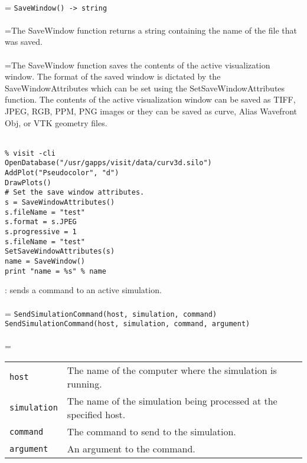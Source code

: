 \documentclass[10pt,a4paper]{report}
\begin{document}
 \\ 
\hangindent=\parindent 
\verb!SaveWindow() -> string!\\ [-3mm]

 \\ 
\hangindent=\parindent The SaveWindow function returns a string containing the name of the file that was saved. \\[-3mm] 

 \\ 
\hangindent=\parindent The SaveWindow function saves the contents of the active visualization window. The format of the saved window is dictated by the SaveWindowAttributes which can be set using the SetSaveWindowAttributes function. The contents of the active visualization window can be saved as TIFF, JPEG, RGB, PPM, PNG images or they can be saved as curve, Alias Wavefront Obj, or VTK geometry files. \\[-3mm] 

\\[-6mm]
\begin{verbatim}% visit -cli
OpenDatabase("/usr/gapps/visit/data/curv3d.silo")
AddPlot("Pseudocolor", "d")
DrawPlots()
# Set the save window attributes.
s = SaveWindowAttributes()
s.fileName = "test"
s.format = s.JPEG
s.progressive = 1
s.fileName = "test"
SetSaveWindowAttributes(s)
name = SaveWindow()
print "name = %s" % name
\end{verbatim}
\newpage


{}
: sends a command to an active simulation.\\[-3mm]

 \\ 
\hangindent=\parindent 
\verb!SendSimulationCommand(host, simulation, command)!\\ 
\verb!SendSimulationCommand(host, simulation, command, argument)!\\ [-3mm]

 \\ 
\hangindent=\parindent 
\begin{tabular}{lp{9cm}}
\verb!host! & The name of the computer where the simulation is running. \\
\verb!simulation! & The name of the simulation being processed at the specified host. \\
\verb!command! & The command to send to the simulation. \\
\verb!argument! & An argument to the command. \\
\end{tabular} \\[-2mm]
\end{document}
